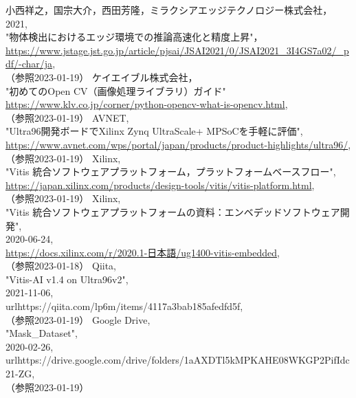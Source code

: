 \documentclass[11pt,a4j]{jreport}
\begin{document}
\begin{thebibliography}{99}
   小西祥之，国宗大介，西田芳隆，ミラクシアエッジテクノロジー株式会社， \\2021, \\"物体検出におけるエッジ環境での推論高速化と精度上昇"， \\\url{https://www.jstage.jst.go.jp/article/pjsai/JSAI2021/0/JSAI2021_3I4GS7a02/_pdf/-char/ja}, \\（参照2023-01-19）
   ケイエイブル株式会社， \\"初めてのOpen CV（画像処理ライブラリ）ガイド" \\\url{https://www.klv.co.jp/corner/python-opencv-what-is-opencv.html}, \\（参照2023-01-19）
   AVNET, \\"Ultra96開発ボードでXilinx Zynq UltraScale+ MPSoCを手軽に評価", \\\url{https://www.avnet.com/wps/portal/japan/products/product-highlights/ultra96/}, \\（参照2023-01-19）
   Xilinx, \\"Vitis 統合ソフトウェアプラットフォーム，プラットフォームベースフロー", \\\url{https://japan.xilinx.com/products/design-tools/vitis/vitis-platform.html}, \\（参照2023-01-19）
   Xilinx, \\"Vitis 統合ソフトウェアプラットフォームの資料：エンベデッドソフトウェア開発", \\2020-06-24, \\\url{https://docs.xilinx.com/r/2020.1-日本語/ug1400-vitis-embedded}, \\（参照2023-01-18）
   Qiita, \\"Vitis-AI v1.4 on Ultra96v2", \\2021-11-06, \\url{https://qiita.com/lp6m/items/4117a3bab185afedfd5f}, \\（参照2023-01-19）
   Google Drive, \\"Mask_Dataset", \\2020-02-26, \\url{https://drive.google.com/drive/folders/1aAXDTl5kMPKAHE08WKGP2PifIdc21-ZG}, \\（参照2023-01-19）
\end{thebibliography}
\end{document}
